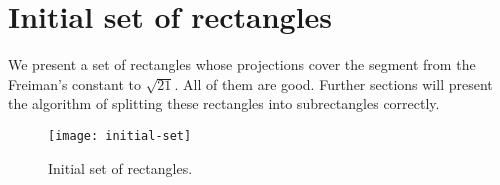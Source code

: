 \section{Initial set of rectangles}

We present a set of rectangles
whose projections cover the segment from the Freiman's constant to $\sqrt{21}$.
All of them are good.
Further sections will present the algorithm of splitting these rectangles into subrectangles correctly.


\begin{figure}[H]
	\centering
	\texttt{[image: initial-set]}
	\caption{Initial set of rectangles.}
	\label{initial-set}
\end{figure}
